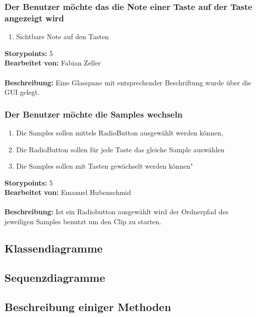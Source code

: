 \subsubsection{Der Benutzer möchte das die Note einer Taste auf der Taste angezeigt wird}

\begin{enumerate}
 \item Sichtbare Note auf den Tasten
\end{enumerate}

\textbf{Storypoints:} 5 \\
\textbf{Bearbeitet von:} Fabian Zeller \\
\\
\textbf{Beschreibung:} Eine Glasspane mit entsprechender Beschriftung wurde über die GUI gelegt.


\subsubsection{Der Benutzer möchte die Samples wechseln}

\begin{enumerate}
 \item Die Samples sollen mittels RadioButton ausgewählt werden können,
 \item Die RadioButton sollen für jede Taste das gleiche Sample auswählen
 \item Die Samples sollen mit Tasten gewächselt werden können"
\end{enumerate}

\textbf{Storypoints:} 5 \\
\textbf{Bearbeitet von:} Emanuel Hubenschmid \\
\\
\textbf{Beschreibung:} Ist ein Radiobutton ausgewählt wird der Ordnerpfad 
des jeweiligen Samples benutzt um den Clip zu starten.


\newpage


\subsection{Klassendiagramme}
\subsection{Sequenzdiagramme}


\subsection{Beschreibung einiger Methoden}




